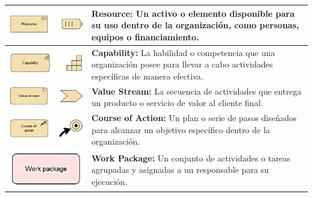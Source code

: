 \begin{longtable}{|c|p{8cm}|}
\hline
\includegraphics{apendices/ARCHI/strategy/resource.png} & 
\textbf{Resource:} Un activo o elemento disponible para su uso dentro de la organización, como personas, equipos o financiamiento. \\
\hline
\includegraphics{apendices/ARCHI/strategy/capability.png} & 
\textbf{Capability:} La habilidad o competencia que una organización posee para llevar a cabo actividades específicas de manera efectiva. \\
\hline
\includegraphics{apendices/ARCHI/strategy/stream.png} & 
\textbf{Value Stream:} La secuencia de actividades que entrega un producto o servicio de valor al cliente final. \\
\hline
\includegraphics{apendices/ARCHI/strategy/action.png} & 
\textbf{Course of Action:} Un plan o serie de pasos diseñados para alcanzar un objetivo específico dentro de la organización. \\
\hline
\includegraphics{apendices/ARCHI/strategy/work.png} & 
\textbf{Work Package:} Un conjunto de actividades o tareas agrupadas y asignadas a un responsable para su ejecución. \\

\end{longtable}
